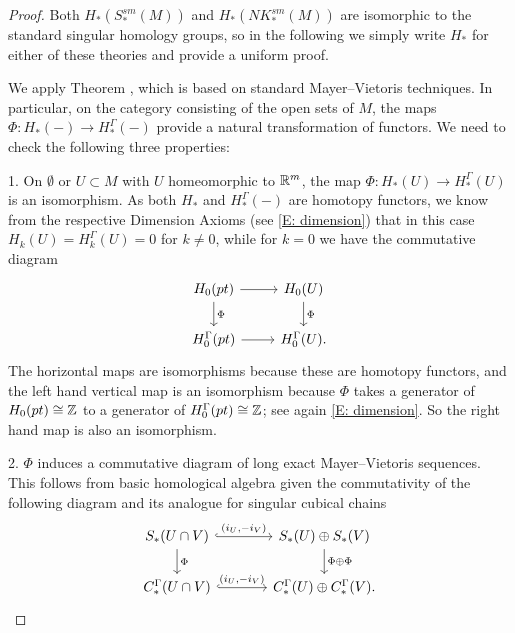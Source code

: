 \begin{proof}
	Both $H_*(S^{sm}_*(M))$ and $H_*(NK^{sm}_*(M))$ are isomorphic to the standard singular homology groups, so in the following we simply write $H_*$ for either of these theories and provide a uniform proof.

	We apply Theorem \cite[5.1.1]{Frie20}, which is based on standard Mayer--Vietoris techniques.
	In particular, on the category consisting of the open sets of $M$, the maps $\Phi: H_*(-) \to H_*^\Gamma(-)$ provide a natural transformation of functors.
	We need to check the following three properties:

	1.
	On $\emptyset$ or $U \subset M$ with $U$ homeomorphic to $\mathbb{R}^m$, the map $\Phi: H_*(U) \to H_*^\Gamma(U)$ is an isomorphism.
	As both $H_*$ and $H_*^\Gamma(-)$ are homotopy functors, we know from the respective Dimension Axioms (see \cref{E: dimension}) that in this case $H_k(U) = H_k^\Gamma(U) = 0$ for $k\neq 0$, while for $k = 0$ we have the commutative diagram
	\[
	\begin{tikzcd}
		H_0(pt) \arrow[r] \arrow[d, "\Phi"] & H_0(U) \arrow[d, "\Phi"] \\
		H_0^\Gamma(pt) \arrow[r] & H^\Gamma_0(U).
	\end{tikzcd}
	\]
	The horizontal maps are isomorphisms because these are homotopy functors, and the left hand vertical map is an isomorphism because $\Phi$ takes a generator of $H_0(pt) \cong \mathbb{Z}$ to a generator of $H_0^\Gamma(pt) \cong \mathbb{Z}$; see again \cref{E: dimension}.
	So the right hand map is also an isomorphism.

	2.
	$\Phi$ induces a commutative diagram of long exact Mayer--Vietoris sequences.
	This follows from basic homological algebra given the commutativity of the following diagram and its analogue for singular cubical chains
	\[
	\begin{tikzcd}[column sep=large]
		S_*(U \cap V) \arrow[r, "{(i_U, -i_V)}", hook] \arrow[d, "\Phi"] & S_*(U) \oplus S_*(V) \arrow[d, "\Phi \oplus \Phi"] \\
		C_*^\Gamma(U \cap V) \arrow[r, "{(i_U, -i_V)}", hook] & C_*^\Gamma(U) \oplus C_*^\Gamma(V).
	\end{tikzcd}
	\]


\end{proof}
